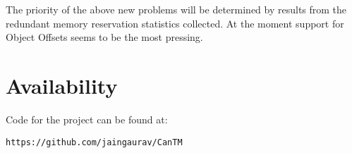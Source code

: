 \documentclass[letterpaper,twocolumn,10pt]{article}
\begin{document}
The priority of the above new problems will be determined by results from the redundant memory reservation statistics collected. At the moment support for Object Offsets seems to be the most pressing.

\section{Availability}

Code for the project can be found at:

\begin{center}
{\tt https://github.com/jaingaurav/CanTM}\\
\end{center}
\end{document}
